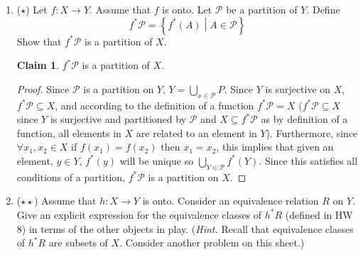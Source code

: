 \documentclass[11pt]{letter}
\theoremstyle{definition}
\newtheorem{claim}{Claim}
\begin{document}
\begin{description}
\begin{enumerate}
			
			\item ($\star$) Let $f:X\rightarrow Y$. Assume that $f$ is onto. Let $\mathcal{P}$ be a partition of $Y$. Define 
				\begin{equation*}
					f^*\mathcal{P}=\left\{f^*(A)\middle\vert A\in\mathcal{P}\right\}
				\end{equation*}
				Show that $f^*\mathcal{P}$ is a partition of $X$.
                                \begin{claim}
                                  $f^*\mathcal{P}$ is a partition of $X$.
                                \end{claim}
                                \begin{proof}
                                  Since $\mathcal{P}$ is a partition on $Y$, $Y=\bigcup_{x\in\mathcal{P}}P$. Since $Y$ is surjective on $X$, $f^*\mathcal{P}\subseteq X$, and according to the definition of a function $f^*\mathcal{P}= X$ ($f^*\mathcal{P}\subseteq X$ since $Y$ is surjective and partitioned by $\mathcal{P}$ and $X\subseteq f^*\mathcal{P}$ as by definition of a function, all elements in $X$ are related to an element in $Y$). Furthermore, since $\forall x_1,x_2\in X$ if $f(x_1)=f(x_2)$ then $x_1=x_2$, this implies that given an element, $y\in Y$, $f^*(y)$ will be unique so $\bigcup_{Y\in \mathcal{P}}f^*(Y)$. Since this satisfies all conditions of a partition, $f^*\mathcal{P}$ is a partition on $X$. 
                                \end{proof}
                                
                                
				
			\item ($\star\star$) Assume that $h:X\rightarrow Y$ is onto. Consider an equivalence relation $R$ on $Y$. Give an explicit expression for the equivalence classes of $h^*R$ (defined in HW 8) in terms of the other objects in play. ({\em Hint.} Recall that equivalence classes of $h^*R$ are subsets of $X$. Consider another problem on this sheet.)
		


\end{enumerate}
\end{description}
\end{document}
